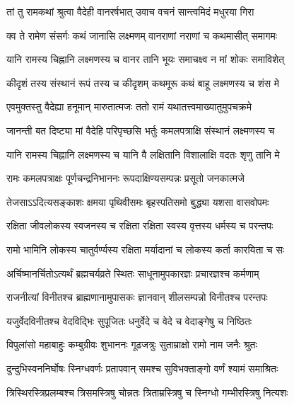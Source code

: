 
\twolineshloka
{तां तु रामकथां श्रुत्वा वैदेही वानरर्षभात्}
{उवाच वचनं सान्त्वमिदं मधुरया गिरा} %

\twolineshloka
{क्व ते रामेण संसर्गः कथं जानासि लक्ष्मणम्}
{वानराणां नराणां च कथमासीत् समागमः} %

\twolineshloka
{यानि रामस्य चिह्नानि लक्ष्मणस्य च वानर}
{तानि भूयः समाचक्ष्व न मां शोकः समाविशेत्} %

\twolineshloka
{कीदृशं तस्य संस्थानं रूपं तस्य च कीदृशम्}
{कथमूरू कथं बाहू लक्ष्मणस्य च शंस मे} %

\twolineshloka
{एवमुक्तस्तु वैदेह्या हनूमान् मारुतात्मजः}
{ततो रामं यथातत्त्वमाख्यातुमुपचक्रमे} %

\twolineshloka
{जानन्ती बत दिष्ट्या मां वैदेहि परिपृच्छसि}
{भर्तुः कमलपत्राक्षि संस्थानं लक्ष्मणस्य च} %

\twolineshloka
{यानि रामस्य चिह्नानि लक्ष्मणस्य च यानि वै}
{लक्षितानि विशालाक्षि वदतः शृणु तानि मे} %

\twolineshloka
{रामः कमलपत्राक्षः पूर्णचन्द्रनिभाननः}
{रूपदाक्षिण्यसम्पन्नः प्रसूतो जनकात्मजे} %

\twolineshloka
{तेजसाऽऽदित्यसङ्काशः क्षमया पृथिवीसमः}
{बृहस्पतिसमो बुद्ध्या यशसा वासवोपमः} %

\twolineshloka
{रक्षिता जीवलोकस्य स्वजनस्य च रक्षिता}
{रक्षिता स्वस्य वृत्तस्य धर्मस्य च परन्तपः} %

\twolineshloka
{रामो भामिनि लोकस्य चातुर्वर्ण्यस्य रक्षिता}
{मर्यादानां च लोकस्य कर्ता कारयिता च सः} %

\twolineshloka
{अर्चिष्मानर्चितोऽत्यर्थं ब्रह्मचर्यव्रते स्थितः}
{साधूनामुपकारज्ञः प्रचारज्ञश्च कर्मणाम्} %

\twolineshloka
{राजनीत्यां विनीतश्च ब्राह्मणानामुपासकः}
{ज्ञानवान् शीलसम्पन्नो विनीतश्च परन्तपः} %

\twolineshloka
{यजुर्वेदविनीतश्च वेदविद्भिः सुपूजितः}
{धनुर्वेदे च वेदे च वेदाङ्गेषु च निष्ठितः} %

\twolineshloka
{विपुलांसो महाबाहुः कम्बुग्रीवः शुभाननः}
{गूढजत्रुः सुताम्राक्षो रामो नाम जनैः श्रुतः} %

\twolineshloka
{दुन्दुभिस्वननिर्घोषः स्निग्धवर्णः प्रतापवान्}
{समश्च सुविभक्ताङ्गो वर्णं श्यामं समाश्रितः} %

\twolineshloka
{त्रिस्थिरस्त्रिप्रलम्बश्च त्रिसमस्त्रिषु चोन्नतः}
{त्रिताम्रस्त्रिषु च स्निग्धो गम्भीरस्त्रिषु नित्यशः} %

